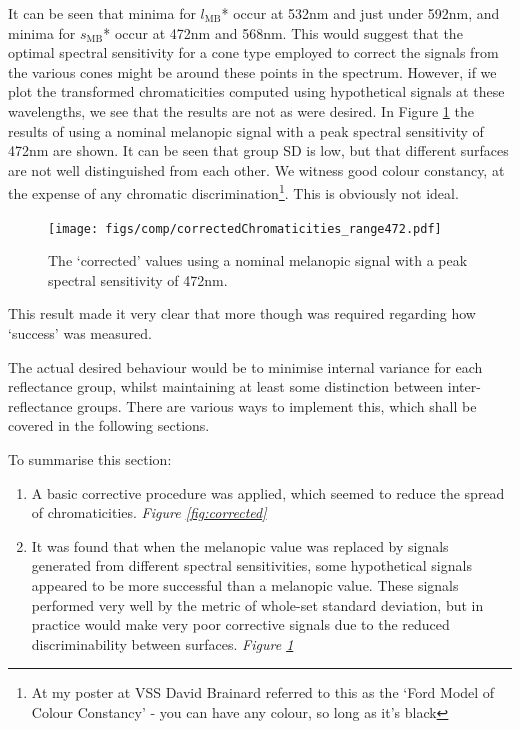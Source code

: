 It can be seen that minima for $l_{\text{MB}}$* occur at 532nm and just under 592nm, and minima for $s_{\text{MB}}$* occur at 472nm and 568nm. This would suggest that the optimal spectral sensitivity for a cone type employed to correct the signals from the various cones might be around these points in the spectrum. However, if we plot the transformed chromaticities computed using hypothetical signals at these wavelengths, we see that the results are not as were desired. In Figure \ref{fig:472} the results of using a nominal melanopic signal with a peak spectral sensitivity of 472nm are shown. It can be seen that group SD is low, but that different surfaces are not well distinguished from each other. We witness good colour constancy, at the expense of any chromatic discrimination\footnote{At my poster at VSS David Brainard referred to this as the `Ford Model of Colour Constancy' - you can have any colour, so long as it's black}. This is obviously not ideal.

\begin{figure}[htbp]
    \texttt{[image: figs/comp/correctedChromaticities\_range472.pdf]}
    \caption{The `corrected' values using a nominal melanopic signal with a peak spectral sensitivity of 472nm.}
    \label{fig:472}
\end{figure} 

This result made it very clear that more though was required regarding how `success' was measured.

The actual desired behaviour would be to minimise internal variance for each reflectance group, whilst maintaining at least some distinction between inter-reflectance groups. There are various ways to implement this, which shall be covered in the following sections. %

\bigskip
\noindent
To summarise this section:
\begin{enumerate}
    \item A basic corrective procedure was applied, which seemed to reduce the spread of chromaticities. \emph{Figure \ref{fig:corrected}} 
    \item It was found that when the melanopic value was replaced by signals generated from different spectral sensitivities, some hypothetical signals appeared to be more successful than a melanopic value. These signals performed very well by the metric of whole-set standard deviation, but in practice would make very poor corrective signals due to the reduced discriminability between surfaces. \emph{Figure \ref{fig:472}}
\end{enumerate}


